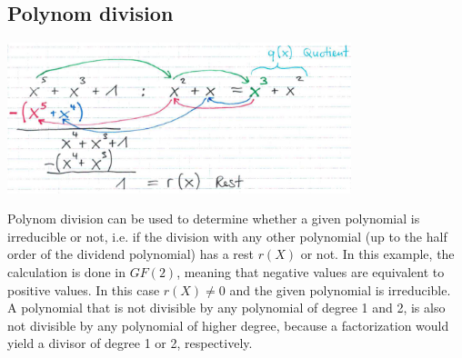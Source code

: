 \subsection{Polynom division}
\begin{minipage}{10.5cm}
	\includegraphics[width=10cm]{./bilder/polynomdivision.png}\\
\end{minipage}
\begin{minipage}{8cm}
	Polynom division can be used to determine whether a given polynomial is irreducible or not, i.e. if the division with any other polynomial (up to the half 
	order of the dividend polynomial) has a rest $r(X)$ or not. In this example, the calculation is done in $GF(2)$, meaning that negative values are 
	equivalent to positive values. In this case $r(X)\neq 0$ and the given polynomial is irreducible.\\
	A polynomial that is not divisible by any polynomial of degree 1 and 2, is also not divisible by any polynomial of higher degree, because a factorization 
	would yield a divisor of degree 1 or 2, respectively.\\
\end{minipage}
